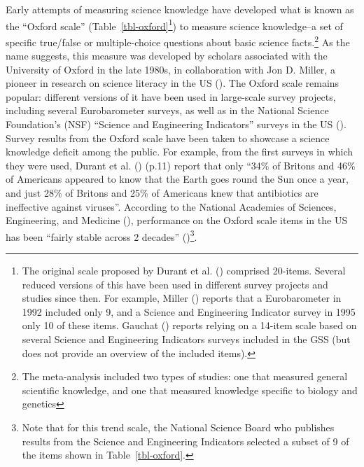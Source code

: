 \documentclass[
  jou,
  floatsintext,
  longtable,
  nolmodern,
  notxfonts,
  notimes,
  colorlinks=true,linkcolor=blue,citecolor=blue,urlcolor=blue]{apa7}
\begin{document}
Early attempts of measuring science knowledge have developed what is
known as the ``Oxford scale'' (Table~\ref{tbl-oxford}\footnote{The
  original scale proposed by Durant et al.
  () comprised
  20-items. Several reduced versions of this have been used in different
  survey projects and studies since then. For example, Miller
  () reports
  that a Eurobarometer in 1992 included only 9, and a Science and
  Engineering Indicator survey in 1995 only 10 of these items. Gauchat
  () reports
  relying on a 14-item scale based on several Science and Engineering
  Indicators surveys included in the GSS (but does not provide an
  overview of the included items).}) to measure science knowledge--a set
of specific true/false or multiple-choice questions about basic science
facts.\footnote{The meta-analysis included two types of studies: one
  that measured general scientific knowledge, and one that measured
  knowledge specific to biology and genetics} As the name suggests, this
measure was developed by scholars associated with the University of
Oxford in the late 1980s, in collaboration with Jon D. Miller, a pioneer
in research on science literacy in the US
(). The Oxford scale remains popular: different versions of it have
been used in large-scale survey projects, including several
Eurobarometer surveys, as well as in the National Science Foundation's
(NSF) ``Science and Engineering Indicators'' surveys in the US
(). Survey results
from the Oxford scale have been taken to showcase a science knowledge
deficit among the public. For example, from the first surveys in which
they were used, Durant et al.
() (p.11)
report that only ``34\% of Britons and 46\% of Americans appeared to
know that the Earth goes round the Sun once a year, and just 28\% of
Britons and 25\% of Americans knew that antibiotics are ineffective
against viruses''. According to the National Academies of Sciences,
Engineering, and Medicine
(),
performance on the Oxford scale items in the US has been ``fairly stable
across 2 decades''
()\footnote{Note that for this trend scale, the National Science Board
  who publishes results from the Science and Engineering Indicators
  selected a subset of 9 of the items shown in Table~\ref{tbl-oxford}.}.
\end{document}
